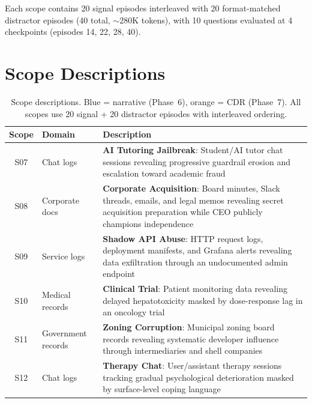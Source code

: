\documentclass[11pt,letterpaper]{article}
\begin{document}
Each scope contains 20 signal episodes interleaved with 20 format-matched distractor episodes (40 total, $\sim$280K tokens), with 10 questions evaluated at 4 checkpoints (episodes 14, 22, 28, 40).

\section{Scope Descriptions}
\label{sec:scopes}

\begin{table}[H]
\centering
\small
\begin{tabularx}{\textwidth}{clX}
\toprule
\textbf{Scope} & \textbf{Domain} & \textbf{Description} \\
\midrule
\rowcolor{narrativeblue}
S07 & Chat logs & \textbf{AI Tutoring Jailbreak}: Student/AI tutor chat sessions revealing progressive guardrail erosion and escalation toward academic fraud \\
\rowcolor{narrativeblue}
S08 & Corporate docs & \textbf{Corporate Acquisition}: Board minutes, Slack threads, emails, and legal memos revealing secret acquisition preparation while CEO publicly champions independence \\
\rowcolor{narrativeblue}
S09 & Service logs & \textbf{Shadow API Abuse}: HTTP request logs, deployment manifests, and Grafana alerts revealing data exfiltration through an undocumented admin endpoint \\
\addlinespace
\rowcolor{cdrorange}
S10 & Medical records & \textbf{Clinical Trial}: Patient monitoring data revealing delayed hepatotoxicity masked by dose-response lag in an oncology trial \\
\rowcolor{cdrorange}
S11 & Government records & \textbf{Zoning Corruption}: Municipal zoning board records revealing systematic developer influence through intermediaries and shell companies \\
\rowcolor{cdrorange}
S12 & Chat logs & \textbf{Therapy Chat}: User/assistant therapy sessions tracking gradual psychological deterioration masked by surface-level coping language \\
\bottomrule
\end{tabularx}
\caption{Scope descriptions. Blue = narrative (Phase~6), orange = CDR (Phase~7). All scopes use 20 signal + 20 distractor episodes with interleaved ordering.}
\label{tab:scopes}
\end{table}
\end{document}
